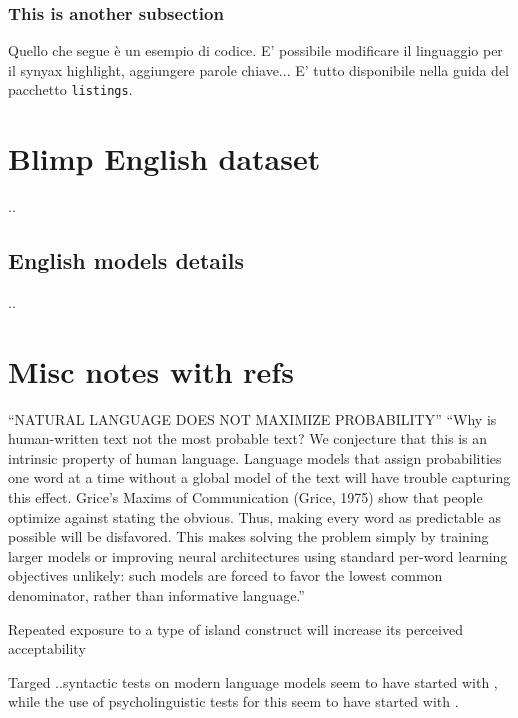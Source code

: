 \subsubsection{This is another subsection}

Quello che segue è un esempio di codice. E' possibile modificare il linguaggio per il synyax highlight, aggiungere parole chiave... E' tutto disponibile nella guida del pacchetto \texttt{listings}.

 

\section{Blimp English dataset}
..
\subsection{English models details}
..

\section{Misc notes with refs}

“NATURAL LANGUAGE DOES NOT MAXIMIZE PROBABILITY” 
“Why is human-written text not the most probable text? We conjecture that this is an intrinsic property of human language. Language models that assign probabilities one word at a time without a global model of the text will have trouble capturing this effect. Grice’s Maxims of Communication (Grice, 1975) show that people optimize against stating the obvious. Thus, making every word as predictable as possible will be disfavored. This makes solving the problem simply by training larger models or improving neural architectures using standard per-word learning objectives unlikely: such models are forced to favor the lowest common denominator, rather than informative language.” 
\citep{holtzman2019curious}

Repeated exposure to a type of island construct will increase its perceived acceptability 
\citep{chaves2014subject}

Targed ..syntactic tests on modern language models seem to have started with \citet{linzen2016assessing}, while the use of psycholinguistic tests for this seem to have started with \citet{futrell2018rnns}.
